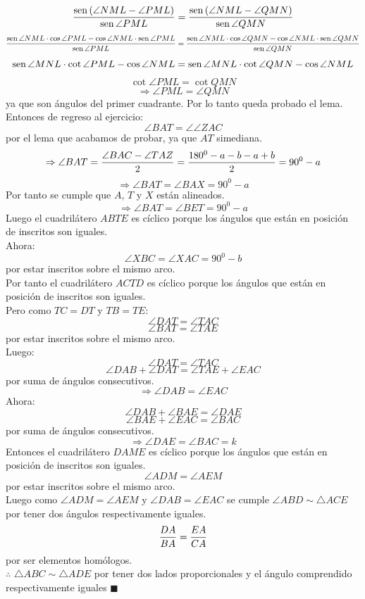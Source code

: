 \documentclass{book}
\newcommand{\sen}{\mathop{\rm sen}\nolimits} %
\begin{document}
\begin{enumerate}
$$\frac{\sen {(\angle NML-\angle PML)}}{\sen {\angle PML}}=\frac{\sen {(\angle NML-\angle QMN)}}{\sen {\angle QMN}}$$
$$\frac{\sen{\angle NML}\cdot\cos{\angle PML}-\cos{\angle NML}\cdot\sen{\angle PML}}{\sen{\angle PML}}=\frac{\sen{\angle NML}\cdot\cos{\angle QMN}-\cos{\angle NML}\cdot\sen{\angle QMN}}{\sen{\angle QMN}}$$
$$\sen{\angle MNL}\cdot\cot{\angle PML}-\cos{\angle NML}=\sen{\angle MNL}\cdot\cot{\angle QMN}-\cos{\angle NML}$$
$$\cot{\angle PML}=\cot{QMN}$$
$$\Rightarrow\angle PML=\angle QMN$$
ya que son ángulos del primer cuadrante. Por lo tanto queda probado el lema.\\
Entonces de regreso al ejercicio:
$$\angle BAT=\angle\angle ZAC$$
por el lema que acabamos de probar, ya que $AT$ simediana.
$$\Rightarrow\angle BAT={\angle BAC-\angle TAZ\over 2}={180^0-a-b-a+b\over 2}=90^0-a$$
$$\Rightarrow\angle BAT=\angle BAX=90^0-a$$
Por tanto se cumple que $A$, $T$ y $X$ están alineados.
$$\Rightarrow\angle BAT=\angle BET=90^0-a$$
Luego el cuadrilátero $ABTE$ es cíclico porque los ángulos que están en posición de inscritos son iguales.\\
Ahora:
$$\angle XBC=\angle XAC=90^0-b$$
por estar inscritos sobre el mismo arco.\\
Por tanto el cuadrilátero $ACTD$ es cíclico porque los ángulos que están en posición de inscritos son iguales. \\
Pero como $TC=DT$ y $TB=TE$:
$$\angle DAT=\angle TAC$$
$$\angle BAT=\angle TAE$$
por estar inscritos sobre el mismo arco.\\
Luego:
$$\angle DAT=\angle TAC$$
$$\angle DAB+\angle DAT=\angle TAE+\angle EAC$$
por suma de ángulos consecutivos.
$$\Rightarrow\angle DAB=\angle EAC$$
Ahora:
$$\angle DAB+\angle BAE=\angle DAE$$
$$\angle BAE+\angle EAC=\angle BAC$$
por suma de ángulos consecutivos.
$$\Rightarrow\angle DAE=\angle BAC=k$$
Entonces el cuadrilátero $DAME$ es cíclico porque los ángulos que están en posición de inscritos son iguales. 
$$\angle ADM=\angle AEM$$
por estar inscritos sobre el mismo arco.\\
Luego como $\angle ADM=\angle AEM$ y $\angle DAB=\angle EAC$ se cumple $\angle ABD\sim\triangle ACE$ por tener dos ángulos respectivamente iguales.
$${DA\over BA}={EA\over CA}$$
por ser elementos homólogos.\\
$\therefore$ $\triangle ABC\sim\triangle ADE$ por tener dos lados proporcionales y el ángulo comprendido respectivamente iguales $\blacksquare$\\

			\end{enumerate}	
			
\end{document}
